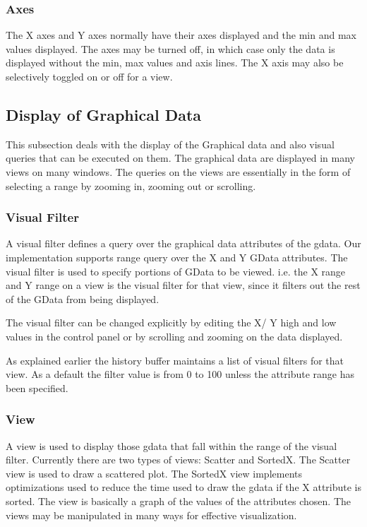 \subsubsection{Axes}

The X axes and Y axes normally have their axes displayed and the min
and max values displayed. The axes may be turned off, in which case
only the data is displayed without the min, max values and axis
lines. The X axis may also be selectively toggled on or off for a
view.

\subsection{Display of Graphical Data}

This subsection deals with the display of the Graphical data and also
visual queries that can be executed on them. The graphical data are
displayed in many views on many windows. The queries on the views are
essentially in the form of selecting a range by zooming in, zooming
out or scrolling.

\subsubsection{Visual Filter}

A visual filter defines a query over the graphical data attributes of
the gdata. Our implementation supports range query over the X and Y
GData attributes. The visual filter is used to specify portions of
GData to be viewed. i.e. the X range and Y range on a view is the
visual filter for that view, since it filters out the rest of the
GData from being displayed.

The visual filter can be changed explicitly by editing the X/ Y high
and low values in the control panel or by scrolling and zooming on the
data displayed.

As explained earlier the history buffer maintains a list of visual
filters for that view. As a default the filter value is from 0 to 100
unless the attribute range has been specified.

\subsubsection{View}

A view is used to display those gdata that fall within the range of
the visual filter. Currently there are two types of views: Scatter and
SortedX. The Scatter view is used to draw a scattered plot. The
SortedX view implements optimizations used to reduce the time used to
draw the gdata if the X attribute is sorted. The view is basically a
graph of the values of the attributes chosen. The views may be
manipulated in many ways for effective visualization.


